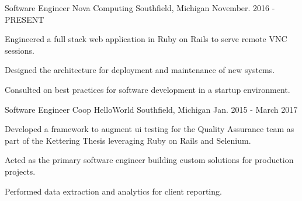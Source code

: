 
\begin{cventries}


  \cventry
    {Software Engineer} %
    {Nova Computing} %
    {Southfield, Michigan} %
    {November. 2016 - PRESENT} %
    {
      \begin{cvitems} %
        \item {Engineered a full stack web application in Ruby on Rails to serve remote VNC sessions.}
        \item {Designed the architecture for deployment and maintenance of new systems.}
	      \item {Consulted on best practices for software development in a startup environment.}
      \end{cvitems}
    }


  \cventry
    {Software Engineer Coop} %
    {HelloWorld} %
    {Southfield, Michigan} %
    {Jan. 2015 - March 2017} %
    {
      \begin{cvitems} %
        \item {Developed a framework to augment ui testing for the Quality Assurance
        team as part of the Kettering Thesis leveraging Ruby on Rails and Selenium.}
        \item {Acted as the primary software engineer building custom solutions for production projects.}
        \item {Performed data extraction and analytics for client reporting.}
      \end{cvitems}
    }


\end{cventries}
